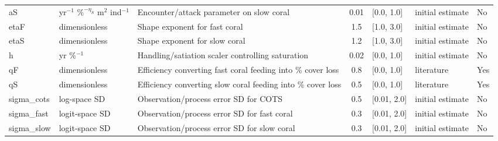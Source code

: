 \begin{landscape}
\begin{table}[ht]
\begin{tabularx}{1.0\linewidth}{l p{3cm} p{7cm} c l l l}
aS & yr$^{-1}$ \%$^{-\eta_S}$ m$^{2}$ ind$^{-1}$ & Encounter/attack parameter on slow coral & 0.01 & [0.0, 1.0] & initial estimate & No \\
etaF & dimensionless & Shape exponent for fast coral & 1.5 & [1.0, 3.0] & initial estimate & No \\
etaS & dimensionless & Shape exponent for slow coral & 1.2 & [1.0, 3.0] & initial estimate & No \\
h & yr \%$^{-1}$ & Handling/satiation scaler controlling saturation & 0.02 & [0.0, 1.0] & initial estimate & No \\
qF & dimensionless & Efficiency converting fast coral feeding into \% cover loss & 0.8 & [0.0, 1.0] & literature & Yes \citep{Rogers_Plaganyi_2022} \\
qS & dimensionless & Efficiency converting slow coral feeding into \% cover loss & 0.5 & [0.0, 1.0] & literature & Yes \citep{Rogers_Plaganyi_2022} \\
sigma\_cots & log-space SD & Observation/process error SD for COTS & 0.5 & [0.01, 2.0] & initial estimate & No \\
sigma\_fast & logit-space SD & Observation/process error SD for fast coral & 0.3 & [0.01, 2.0] & initial estimate & No \\
sigma\_slow & logit-space SD & Observation/process error SD for slow coral & 0.3 & [0.01, 2.0] & initial estimate & No \\
\bottomrule
\end{tabularx}
\end{table}
\end{landscape}

